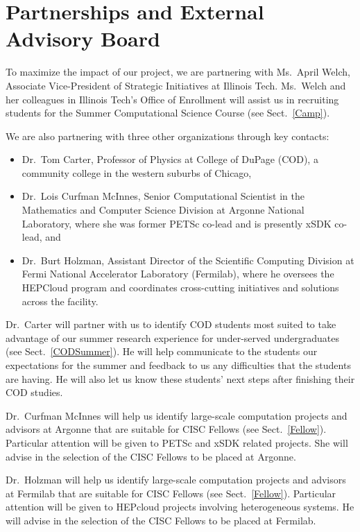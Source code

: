 \documentclass[11pt]{NSFamsart}
\begin{document}
\section{Partnerships and External Advisory Board} \label{PartnerSec}
To maximize the impact of our project, we are partnering with Ms.~April Welch, Associate Vice-President of Strategic Initiatives at Illinois Tech. Ms.~Welch and her colleagues in Illinois Tech's Office of Enrollment will assist us in recruiting students for the Summer Computational Science Course (see Sect.~\ref{Camp}).

We are also partnering with three other organizations through key contacts:
\begin{itemize}

\item Dr.~Tom Carter, Professor of Physics at College of DuPage (COD), a community college in the western suburbs of Chicago, 

\item Dr.~Lois Curfman McInnes, Senior Computational Scientist in the Mathematics and Computer Science Division at Argonne National Laboratory, where she was former PETSc co-lead and is presently xSDK co-lead, and

\item Dr.~Burt Holzman, Assistant Director of the Scientific Computing
Division at Fermi National Accelerator Laboratory (Fermilab), where he oversees the
HEPCloud program and coordinates cross-cutting initiatives and solutions
across the facility.

\end{itemize}


Dr.~Carter will partner with us to identify COD students most suited to take advantage of our summer research experience for under-served undergraduates (see Sect.~\ref{CODSummer}).  He will help communicate to the students our expectations for the summer and feedback to us any difficulties that the students are having.  He will also let us know these students' next steps after finishing their COD studies.

Dr.~Curfman McInnes will help us identify large-scale computation projects and advisors at Argonne that are suitable for CISC Fellows (see Sect.~\ref{Fellow}).  Particular attention will be given to PETSc and xSDK related projects.  She will advise in the selection of the CISC Fellows to be placed at Argonne.

Dr.~Holzman will help us identify large-scale computation projects and advisors at Fermilab that are suitable for CISC Fellows (see Sect.~\ref{Fellow}).  Particular attention will be given to HEPcloud projects involving heterogeneous systems.  He will advise in the selection of the CISC Fellows to be placed at Fermilab.
\end{document}
